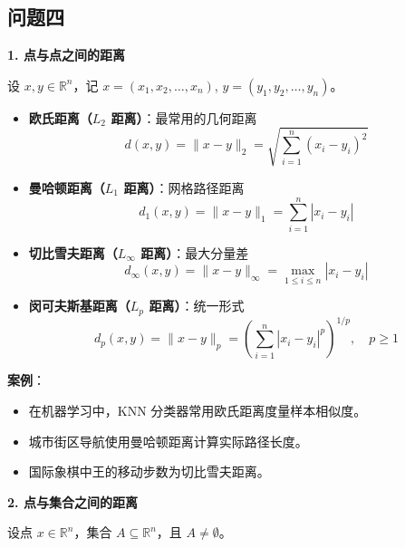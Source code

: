 \documentclass[UTF8]{article}
\begin{document}
\subsection*{问题四}
\textbf{1. 点与点之间的距离}
\vspace{0.5em}

设 $x, y \in \mathbb{R}^n$，记 $x = (x_1, x_2, \dots, x_n)$, $y = (y_1, y_2, \dots, y_n)$。

\begin{itemize}[leftmargin=1.5em]
    \item \textbf{欧氏距离（$L_2$ 距离）}：最常用的几何距离
    \begin{equation}
        d(x, y) = \|x - y\|_2 = \sqrt{\sum_{i=1}^n (x_i - y_i)^2}
    \end{equation}
    
    \item \textbf{曼哈顿距离（$L_1$ 距离）}：网格路径距离
    \begin{equation}
        d_1(x, y) = \|x - y\|_1 = \sum_{i=1}^n |x_i - y_i|
    \end{equation}
    
    \item \textbf{切比雪夫距离（$L_\infty$ 距离）}：最大分量差
    \begin{equation}
        d_\infty(x, y) = \|x - y\|_\infty = \max_{1 \leq i \leq n} |x_i - y_i|
    \end{equation}
    
    \item \textbf{闵可夫斯基距离（$L_p$ 距离）}：统一形式
    \begin{equation}
        d_p(x, y) = \|x - y\|_p = \left( \sum_{i=1}^n |x_i - y_i|^p \right)^{1/p}, \quad p \geq 1
    \end{equation}
\end{itemize}

\textbf{案例}：
\begin{itemize}[leftmargin=1.5em]
    \item 在机器学习中，KNN 分类器常用欧氏距离度量样本相似度。
    \item 城市街区导航使用曼哈顿距离计算实际路径长度。
    \item 国际象棋中王的移动步数为切比雪夫距离。
\end{itemize}

\vspace{1em}
\textbf{2. 点与集合之间的距离}
\vspace{0.5em}

设点 $x \in \mathbb{R}^n$，集合 $A \subseteq \mathbb{R}^n$，且 $A \neq \emptyset$。
\end{document}
